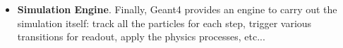 \begin{itemize}
    \item \textbf{Simulation Engine}. Finally, {\sc Geant4} provides an engine to carry out the simulation itself: track all the particles for each step, trigger various transitions for readout, apply the physics processes, etc...
\end{itemize}
